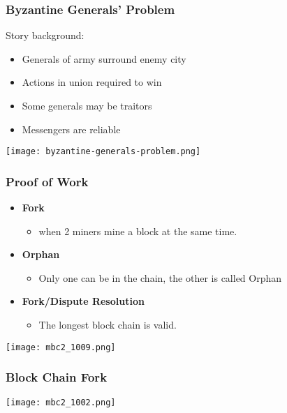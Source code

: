 \begin{frame}
    \frametitle{Byzantine Generals' Problem}
    Story background:
    \begin{itemize}
        \item Generals of army surround enemy city
        \item Actions in union required to win
        \item Some generals may be traitors
        \item Messengers are reliable
    \end{itemize}
    \begin{center}
        \texttt{[image: byzantine-generals-problem.png]}
    \end{center}
\end{frame}

\begin{frame}
    \frametitle{Proof of Work}
    \begin{itemize}
        \item \textbf{Fork}
            \begin{itemize}
                \item when 2 miners mine a block at the same time.
            \end{itemize}
        \item \textbf{Orphan}
            \begin{itemize}
                \item Only one can be in the chain, the other is called \alert{Orphan}
            \end{itemize}
        \item \textbf{Fork/Dispute Resolution}
            \begin{itemize}
                \item The longest block chain is valid.
            \end{itemize}
    \end{itemize}
    \begin{center}
        \texttt{[image: mbc2\_1009.png]}
    \end{center}
\end{frame}

\begin{frame}
    \frametitle{Block Chain Fork}
    \texttt{[image: mbc2\_1002.png]}
\end{frame}

